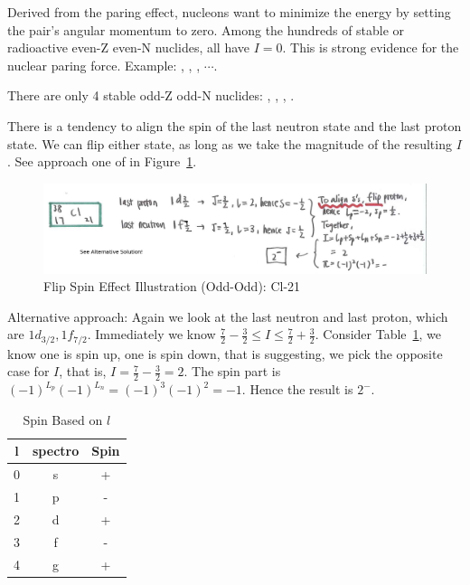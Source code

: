 \documentclass{school-22.101-notes}
\begin{document}
Derived from the paring effect, nucleons want to minimize the energy by setting the pair's angular momentum to zero. Among the hundreds of stable or radioactive even-Z even-N nuclides, all have $I=0$. This is strong evidence for the nuclear paring force. Example: , , , $\cdots$. 


There are only 4 stable odd-Z odd-N nuclides: , , , . 


There is a tendency to align the spin of the last neutron state and the last proton state. We can flip either state, as long as we take the magnitude of the resulting $I$. See approach one of  in Figure~\ref{ns-Cl-21}.
\begin{figure}[ht]
    \centering
    \includegraphics[width=5in]{images/ns/Cl-21.png}
    \caption{Flip Spin Effect Illustration (Odd-Odd): Cl-21}
    \label{ns-Cl-21}
\end{figure}

Alternative approach: Again we look at the last neutron and last proton, which are $1d_{3/2}, 1f_{7/2}$. Immediately we know $ \frac{7}{2} - \frac{3}{2} \le I \le \frac{7}{2} + \frac{3}{2}$. Consider Table~\ref{spin-l}, we know one is spin up, one is spin down, that is suggesting, we pick the opposite case for $I$, that is, $I=\frac{7}{2} - \frac{3}{2} =2$. The spin part is $(-1)^{L_p} (-1)^{L_n} = (-1)^3 (-1)^2 = -1$. Hence the result is $2^-$.  
\begin{table}[ht]
\centering
\begin{tabular}{|c|c|c|} \hline
l & spectro & Spin \\ \hline
0 & s & + \\ \hline
1 & p & - \\ \hline
2 & d & + \\ \hline
3 & f & - \\ \hline
4 & g & + \\ \hline
\end{tabular}
\caption{Spin Based on $l$\label{spin-l}}
\end{table}
\end{document}
